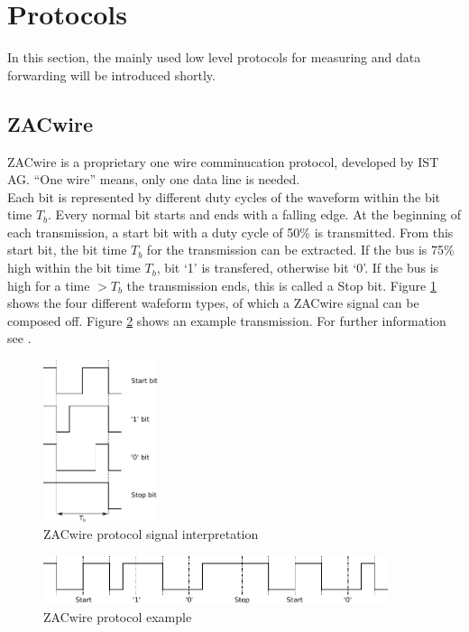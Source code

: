 \documentclass[a4paper]{scrreprt}
\begin{document}
\section{Protocols}
In this section, the mainly used low level protocols for measuring and data forwarding will be introduced shortly. 
\subsection{ZACwire}\label{chap:zac}
ZACwire is a proprietary one wire comminucation protocol, developed
by IST AG. ``One wire'' means, only one data line is needed.\\
Each bit is represented by
different duty cycles of the waveform within the bit time $T_b$.
Every normal bit starts and ends with a falling edge. At the beginning
of each transmission, a start bit with a duty cycle of 50\% is
transmitted. From this start bit, the bit time $T_b$ for the
transmission can be extracted. 
If the bus is 75\% high within the bit time $T_b$, bit `1' is transfered, otherwise bit `0'. 
If the bus is high for a time $>T_b$
the transmission ends, this is called a Stop bit. Figure \ref{fig:zac}
shows the four different wafeform types, of which a ZACwire signal can be
composed off. Figure \ref{fig:zacexample} shows an example
transmission. For further information see \cite{zac}.
\begin{figure}[Hh!]
	\centering
	\includegraphics[width=0.3\textwidth]{img/zac_bits.pdf}
	\caption{ZACwire protocol signal interpretation}
	\label{fig:zac}
\end{figure}
\begin{figure}[h]
	\centering
	\includegraphics[width=0.9\textwidth]{img/zac_example.pdf}
	\caption{ZACwire protocol example}
	\label{fig:zacexample}
\end{figure}
\end{document}
